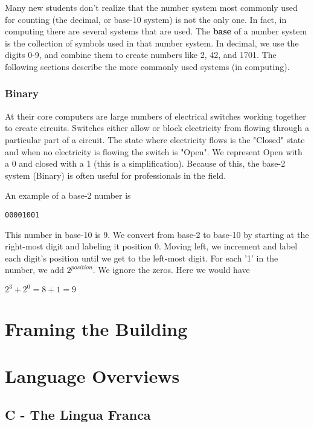 \documentclass[11pt,fleqn]{book} %
\begin{document}
Many new students don't realize that the number system most commonly used for counting (the \gls{decimal}, or \gls{base-10} system) is not the only one.  In fact, in computing there are several systems that are used.  The \textbf{base} of a number system is the collection of symbols used in that number system.  In decimal, we use the digits 0-9, and combine them to create numbers like 2, 42, and 1701.  The following sections describe the more commonly used systems (in computing).

\section{Binary}

At their core computers are large numbers of electrical switches working together to create circuits.  Switches either allow or block electricity from flowing through a particular part of a circuit.  The state where electricity flows is the "Closed" state and when no electricity is flowing the switch is "Open".  We represent Open with a 0 and closed with a 1 (this is a simplification).  Because of this, the base-2 system (Binary) is often useful for professionals in the field.

An example of a base-2 number is

\begin{verbatim}
00001001
\end{verbatim}

This number in base-10 is 9.  We convert from base-2 to base-10 by starting at the right-most digit and labeling it position 0.  Moving left, we increment and label each digit's position until we get to the left-most digit.  For each '1' in the number, we add $ 2^{position} $.  We ignore the zeros.  Here we would have

$ 2^{3} + 2^{0} = 8 + 1 = 9 $

\part{Framing the Building}

\part{Language Overviews}

\chapter{C - The Lingua Franca}
\end{document}
